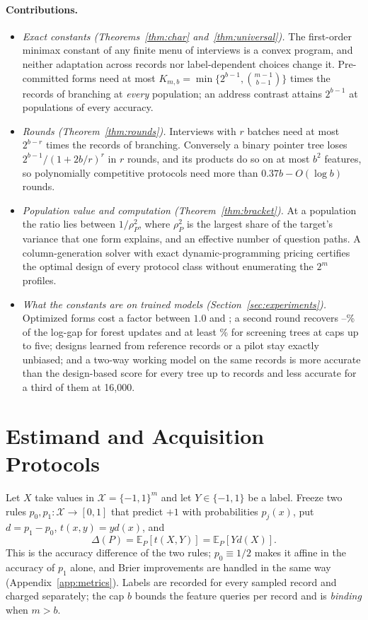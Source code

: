 \documentclass{article}
\newcommand{\E}{\mathbb{E}}
\newcommand{\X}{\mathcal X}
\begin{document}
\paragraph{Contributions.}
\begin{itemize}\itemsep1pt\parskip0pt
\item \emph{Exact constants (Theorems~\ref{thm:char} and~\ref{thm:universal}).} The first-order minimax constant of any finite menu of interviews is a convex program, and neither adaptation across records nor label-dependent choices change it. Pre-committed forms need at most $K_{m,b}=\min\{2^{b-1},\binom{m-1}{b-1}\}$ times the records of branching at \emph{every} population; an address contrast attains $2^{b-1}$ at populations of every accuracy.
\item \emph{Rounds (Theorem~\ref{thm:rounds}).} Interviews with $r$ batches need at most $2^{b-r}$ times the records of branching. Conversely a binary pointer tree loses $2^{b-1}/(1+2b/r)^r$ in $r$ rounds, and its products do so on at most $b^2$ features, so polynomially competitive protocols need more than $0.37b-O(\log b)$ rounds.
\item \emph{Population value and computation (Theorem~\ref{thm:bracket}).} At a population the ratio lies between $1/\rho_P^2$, where $\rho_P^2$ is the largest share of the target's variance that one form explains, and an effective number of question paths. A column-generation solver with exact dynamic-programming pricing certifies the optimal design of every protocol class without enumerating the $2^m$ profiles.
\item \emph{What the constants are on trained models (Section~\ref{sec:experiments}).} Optimized forms cost a factor between $1.0$ and \nMaxAll; a second round recovers \nTwoForestLo--\nTwoForestHi\% of the log-gap for forest updates and at least \nScreenTwoRecMin\% for screening trees at caps up to five; designs learned from reference records or a pilot stay exactly unbiased; and a two-way working model on the same records is more accurate than the design-based score for every tree up to \nCurveLastAllBetter{} records and less accurate for a third of them at 16,000.
\end{itemize}

\section{Estimand and Acquisition Protocols}\label{sec:setup}
Let $X$ take values in $\X=\{-1,1\}^m$ and let $Y\in\{-1,1\}$ be a label. Freeze two rules $p_0,p_1:\X\to[0,1]$ that predict $+1$ with probabilities $p_j(x)$, put $d=p_1-p_0$, $t(x,y)=yd(x)$, and
\begin{equation}
 \Delta(P)=\E_P[t(X,Y)]=\E_P[Yd(X)].\label{eq:gain}
\end{equation}
This is the accuracy difference of the two rules; $p_0\equiv1/2$ makes it affine in the accuracy of $p_1$ alone, and Brier improvements are handled in the same way (Appendix~\ref{app:metrics}). Labels are recorded for every sampled record and charged separately; the cap $b$ bounds the feature queries per record and is \emph{binding} when $m>b$.
\end{document}

